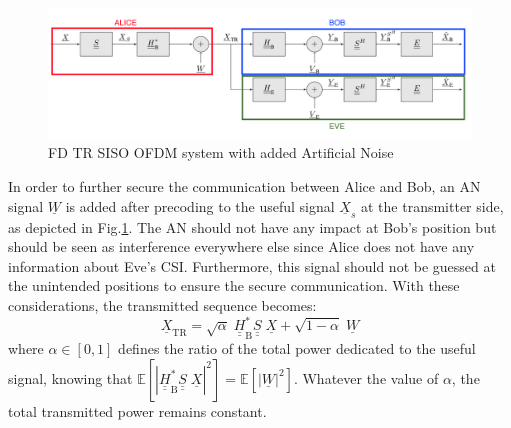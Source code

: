 \documentclass[a4paper,11pt]{article}
\begin{document}
\begin{figure}[t]
    \centering
    \centerline{\includegraphics[width = .53\textwidth]{img/scheme_AN.png}}
    \caption{FD TR SISO OFDM system with added Artificial Noise}
    \label{fig:TR_FD_AN}
\end{figure}
In order to further secure the communication between Alice and Bob, an AN signal $\underline{W}$ is added after precoding to the useful signal $\underline{X}_s$ at the transmitter side, as depicted in Fig.\ref{fig:TR_FD_AN}. The AN should not have any impact at Bob's position but should be seen as interference everywhere else since Alice does not have any information about Eve's CSI. Furthermore, this signal should not be guessed at the unintended positions to ensure the secure communication. With these considerations, the transmitted sequence becomes:
\begin{equation}
    \underline{X}_{\text{TR}} = \sqrt{\alpha} \;\underline{\underline{H}}_{\text{B}}^*  \underline{\underline{S}}\; \underline{X} +  \sqrt{1-\alpha} \; \underline{W}
    \label{eq:sym_rad_AN}
\end{equation} 
where $\alpha \in [0,1]$ defines the ratio of the total power dedicated to the useful signal, knowing that $\mathbb{E}\left[ \left|\underline{\underline{H}}_{\text{B}}^*  \underline{\underline{S}}\; \underline{X}  \right|^2 \right] = \mathbb{E}\left[ \left|\underline{W} \right|^2 \right]$. Whatever the value of $\alpha$, the total transmitted power remains constant.
\end{document}
